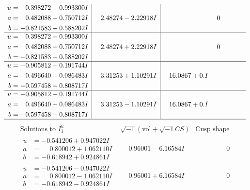 \documentclass[1p]{elsarticle_modified}
\theoremstyle{definition}
\newcommand{\I}{\sqrt{-1}}
\begin{document}
$$\begin{array}{c|c|c}
\begin{aligned}
u &= \phantom{-}0.398272 + 0.993300 I \\
a &= \phantom{-}0.482088 - 0.750712 I \\
b &= -0.821583 - 0.588202 I\end{aligned}
 & \phantom{-}2.48274 - 2.22918 I & \phantom{-0.000000 } 0 \\ \hline\begin{aligned}
u &= \phantom{-}0.398272 - 0.993300 I \\
a &= \phantom{-}0.482088 + 0.750712 I \\
b &= -0.821583 + 0.588202 I\end{aligned}
 & \phantom{-}2.48274 + 2.22918 I & \phantom{-0.000000 } 0 \\ \hline\begin{aligned}
u &= -0.905812 + 0.191744 I \\
a &= \phantom{-}0.496640 + 0.086483 I \\
b &= -0.597458 - 0.808717 I\end{aligned}
 & \phantom{-}3.31253 + 1.10291 I & \phantom{-}16.0867 + 0. I\phantom{ +0.000000I} \\ \hline\begin{aligned}
u &= -0.905812 - 0.191744 I \\
a &= \phantom{-}0.496640 - 0.086483 I \\
b &= -0.597458 + 0.808717 I\end{aligned}
 & \phantom{-}3.31253 - 1.10291 I & \phantom{-}16.0867 + 0. I\phantom{ +0.000000I}\\
 \hline 
 \end{array}$$\newpage$$\begin{array}{c|c|c}  
\text{Solutions to }I^u_{1}& \I (\text{vol} + \sqrt{-1}CS) & \text{Cusp shape}\\
 \hline 
\begin{aligned}
u &= -0.541206 + 0.947022 I \\
a &= \phantom{-}0.800012 + 1.062110 I \\
b &= -0.618942 + 0.924861 I\end{aligned}
 & \phantom{-}0.96001 - 6.16584 I & \phantom{-0.000000 } 0 \\ \hline\begin{aligned}
u &= -0.541206 - 0.947022 I \\
a &= \phantom{-}0.800012 - 1.062110 I \\
b &= -0.618942 - 0.924861 I\end{aligned}
 & \phantom{-}0.96001 + 6.16584 I & \phantom{-0.000000 } 0 \\ \hline\begin{aligned}

\end{aligned}
\end{array}$$
\end{document}
